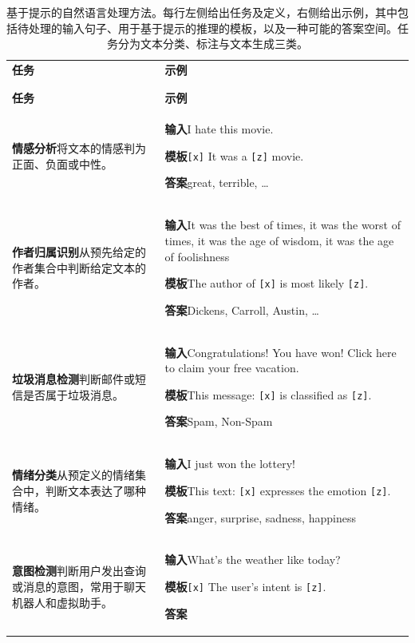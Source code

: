 \begingroup
\small
\setlength{\tabcolsep}{4pt}
\setlength{\LTcapwidth}{\linewidth}
\renewcommand{\arraystretch}{1.07}
\newcommand{\taskexample}[3]{%
  \textbf{输入}\enspace #1\par
  \textbf{模板}\enspace #2\par
  \textbf{答案}\enspace #3}
\newcommand{\inputslots}{[$\symbf{x}_1,\ldots,\symbf{x}_n$]}
\begin{longtable}{@{}>{\raggedright\arraybackslash}p{.37\linewidth}>{\raggedright\arraybackslash}p{.60\linewidth}@{}}
\caption{基于提示的自然语言处理方法。每行左侧给出任务及定义，右侧给出示例，其中包括待处理的输入句子、用于基于提示的推理的模板，以及一种可能的答案空间。任务分为文本分类、标注与文本生成三类。}
\label{tab:ch03-tasks}\\
\endfirsthead
\multicolumn{2}{@{}l}{\textbf{表~\ref{tab:ch03-tasks}（续）}}\\
\toprule
\textbf{任务} & \textbf{示例}\\
\midrule
\endhead
\midrule
\multicolumn{2}{r@{}}{\textit{续下页}}\\
\endfoot
\bottomrule
\endlastfoot
\multicolumn{2}{@{}l}{\textbf{文本分类}}\\
\toprule
\textbf{任务} & \textbf{示例}\\
\midrule
\textbf{情感分析}\enspace 将文本的情感判为正面、负面或中性。 &
\taskexample{I hate this movie.}{\texttt{[x]} It was a \texttt{[z]} movie.}{great, terrible, \ldots}\\
\midrule
\textbf{作者归属识别}\enspace 从预先给定的作者集合中判断给定文本的作者。 &
\taskexample{It was the best of times, it was the worst of times, it was the age of wisdom, it was the age of foolishness}
{The author of \texttt{[x]} is most likely \texttt{[z]}.}{Dickens, Carroll, Austin, \ldots}\\
\midrule
\textbf{垃圾消息检测}\enspace 判断邮件或短信是否属于垃圾消息。 &
\taskexample{Congratulations! You have won! Click here to claim your free vacation.}
{This message: \texttt{[x]} is classified as \texttt{[z]}.}{Spam, Non-Spam}\\
\midrule
\textbf{情绪分类}\enspace 从预定义的情绪集合中，判断文本表达了哪种情绪。 &
\taskexample{I just won the lottery!}{This text: \texttt{[x]} expresses the emotion \texttt{[z]}.}
{anger, surprise, sadness, happiness}\\
\midrule
\textbf{意图检测}\enspace 判断用户发出查询或消息的意图，常用于聊天机器人和虚拟助手。 &
\taskexample{What’s the weather like today?}{\texttt{[x]} The user’s intent is \texttt{[z]}.}

\end{longtable}
